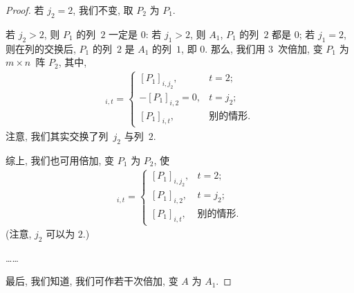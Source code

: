 \documentclass[../libro.tex]{subfiles}
\begin{document}
\begin{proof}
    若 \(j_2 = 2\), 我们不变, 取 \(P_2\) 为 \(P_1\).

    若 \(j_2 > 2\),
    则 \(P_1\) 的列~\(2\) 一定是 \(0\):
    若 \(j_1 > 2\),
    则 \(A_1\), \(P_1\) 的列~\(2\) 都是 \(0\);
    若 \(j_1 = 2\),
    则在列的交换后,
    \(P_1\) 的列~\(2\) 是 \(A_1\) 的列~\(1\),
    即 \(0\).
    那么, 我们用 \(3\)~次倍加, 变 \(P_1\) 为
    \(m \times n\)~阵 \(P_2\),
    其中,
    \begin{align*}
        [P_2]_{i,t} =
        \begin{cases}
            [P_1]_{i,j_2},    & t = 2;       \\
            -[P_1]_{i,2} = 0, & t = j_2;     \\
            [P_1]_{i,t},      & \text{别的情形}.
        \end{cases}
    \end{align*}
    注意, 我们其实交换了列~\(j_2\) 与列~\(2\).

    综上, 我们也可用倍加,
    变 \(P_1\) 为 \(P_2\),
    使
    \begin{align*}
        [P_2]_{i,t} =
        \begin{cases}
            [P_1]_{i,j_2}, & t = 2;       \\
            [P_1]_{i,2},   & t = j_2;     \\
            [P_1]_{i,t},   & \text{别的情形}.
        \end{cases}
    \end{align*}
    (注意, \(j_2\) 可以为 \(2\).)

    ……

    最后, 我们知道, 我们可作若干次倍加,
    变 \(A\) 为 \(A_1\).


\end{proof}
\end{document}
